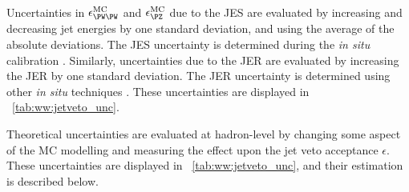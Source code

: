 Uncertainties in $\epsilon^{\text{MC}}_{\WW}$ and $\epsilon^{\text{MC}}_{\PZ}$ due to the 
JES are evaluated by increasing and decreasing jet energies by one standard deviation, 
and using the average of the absolute deviations. The JES uncertainty is determined during 
the \textit{in situ} calibration \cite{Jets:Calib:2011}. Similarly, uncertainties due to the 
JER are evaluated by increasing the JER by one standard deviation. The JER uncertainty is 
determined using other \textit{in situ} techniques \cite{Jets:JER:2011}. These 
uncertainties are displayed in \Table~\ref{tab:ww:jetveto_unc}.

Theoretical uncertainties are evaluated at hadron-level by changing some aspect of the MC 
modelling and measuring the effect upon the jet veto acceptance $\epsilon$. These 
uncertainties are 
displayed in \Table~\ref{tab:ww:jetveto_unc}, and their estimation is described below.

